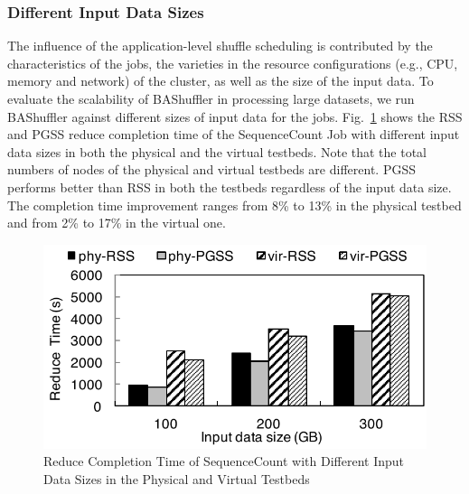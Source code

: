 \documentclass[10pt,journal,compsoc]{IEEEtran}
\begin{document}
\subsubsection{Different Input Data Sizes}
The influence of the application-level shuffle scheduling is contributed by 
the characteristics of the jobs, the varieties in the resource configurations
(e.g., CPU, memory and network) of the cluster, as well as the size of the input data.
To evaluate the scalability of BAShuffler in processing large datasets, 
we run BAShuffler against different sizes of input data for the jobs.
Fig.~\ref{fig:r_sizes} shows the RSS and PGSS reduce completion time of the
SequenceCount Job with different input data sizes
in both the physical and the virtual testbeds. 
Note that the total numbers of nodes of the physical and virtual testbeds are different.
PGSS performs better than RSS in both the testbeds regardless of the input data size. 
The completion time improvement ranges from 8\% to 13\% in the physical testbed
and from 2\% to 17\% in the virtual one. 
 


\begin{figure}[!t]
\centering
\includegraphics[width=0.8\columnwidth,height=0.4\columnwidth]{figure11}
\caption{Reduce Completion Time of SequenceCount with Different Input Data Sizes in the Physical and Virtual Testbeds}
\label{fig:r_sizes}
\end{figure}
\end{document}
